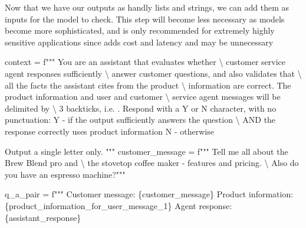 \documentclass[
  letterpaper,
  DIV=11,
  numbers=noendperiod]{scrreprt}
\newenvironment{Shaded}{\begin{snugshade}}{\end{snugshade}}
\newcommand{\CharTok}[1]{\textcolor[rgb]{0.13,0.47,0.30}{#1}}
\newcommand{\NormalTok}[1]{\textcolor[rgb]{0.00,0.23,0.31}{#1}}
\newcommand{\OperatorTok}[1]{\textcolor[rgb]{0.37,0.37,0.37}{#1}}
\newcommand{\SpecialCharTok}[1]{\textcolor[rgb]{0.37,0.37,0.37}{#1}}
\newcommand{\SpecialStringTok}[1]{\textcolor[rgb]{0.13,0.47,0.30}{#1}}
\begin{document}
Now that we have our outputs as handly lists and strings, we can add
them as inputs for the model to check. This step will become less
necessary as models become more sophisticated, and is only recommended
for extremely highly sensitive applications since adds cost and latency
and may be unnecessary

\begin{Shaded}
\begin{Highlighting}[]
\NormalTok{context }\OperatorTok{=} \SpecialStringTok{f"""}
\SpecialStringTok{You are an assistant that evaluates whether }\CharTok{\textbackslash{}}
\SpecialStringTok{customer service agent responses sufficiently }\CharTok{\textbackslash{}}
\SpecialStringTok{answer customer questions, and also validates that }\CharTok{\textbackslash{}}
\SpecialStringTok{all the facts the assistant cites from the product }\CharTok{\textbackslash{}}
\SpecialStringTok{information are correct.}
\SpecialStringTok{The product information and user and customer }\CharTok{\textbackslash{}}
\SpecialStringTok{service agent messages will be delimited by }\CharTok{\textbackslash{}}
\SpecialStringTok{3 backticks, i.e. \textasciigrave{}\textasciigrave{}\textasciigrave{}.}
\SpecialStringTok{Respond with a Y or N character, with no punctuation:}
\SpecialStringTok{Y {-} if the output sufficiently answers the question }\CharTok{\textbackslash{}}
\SpecialStringTok{AND the response correctly uses product information}
\SpecialStringTok{N {-} otherwise}

\SpecialStringTok{Output a single letter only.}
\SpecialStringTok{"""}
\NormalTok{customer\_message }\OperatorTok{=} \SpecialStringTok{f"""}
\SpecialStringTok{Tell me all about the Brew Blend pro and }\CharTok{\textbackslash{}}
\SpecialStringTok{the stovetop coffee maker {-} features and pricing. }\CharTok{\textbackslash{}}
\SpecialStringTok{Also do you have an espresso machine?"""}

\NormalTok{q\_a\_pair }\OperatorTok{=} \SpecialStringTok{f"""}
\SpecialStringTok{Customer message: \textasciigrave{}\textasciigrave{}\textasciigrave{}}\SpecialCharTok{\{}\NormalTok{customer\_message}\SpecialCharTok{\}}\SpecialStringTok{\textasciigrave{}\textasciigrave{}\textasciigrave{}}
\SpecialStringTok{Product information: \textasciigrave{}\textasciigrave{}\textasciigrave{}}\SpecialCharTok{\{}\NormalTok{product\_information\_for\_user\_message\_1}\SpecialCharTok{\}}\SpecialStringTok{\textasciigrave{}\textasciigrave{}\textasciigrave{}}
\SpecialStringTok{Agent response: \textasciigrave{}\textasciigrave{}\textasciigrave{}}\SpecialCharTok{\{}\NormalTok{assistant\_response}\SpecialCharTok{\}}\SpecialStringTok{\textasciigrave{}\textasciigrave{}\textasciigrave{}}


\end{Highlighting}
\end{Shaded}
\end{document}
